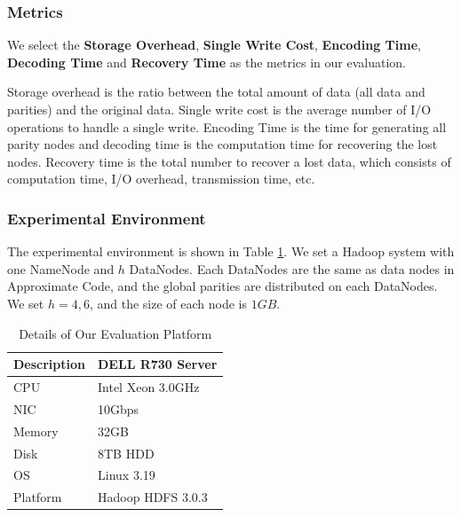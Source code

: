 \documentclass[sigconf]{acmart}
\begin{document}
\subsubsection{Metrics}
We select the \textbf{Storage Overhead}, \textbf{Single Write Cost}, \textbf{Encoding Time}, \textbf{Decoding Time} and \textbf{Recovery Time} as the metrics in our evaluation.

Storage overhead is the ratio between the total amount of data (all data and parities) and the original data. Single write cost is the average number of I/O operations to handle a single write. Encoding Time is the time for generating all parity nodes and decoding time is the computation time for recovering the lost nodes. Recovery time is the total number to recover a lost data, which consists of computation time, I/O overhead, transmission time, etc.

\subsubsection{Experimental Environment}
The experimental environment is shown in Table \ref{tab-platform}. We set a Hadoop system with one NameNode and $h$ DataNodes. Each DataNodes are the same as data nodes in Approximate Code, and the global parities are distributed on each DataNodes. We set $h=4,6$, and the size of each node is $1GB$. 



\begin{table}[!ht]\footnotesize
\begin{tabular}{|l|l|}
\hline
Description & DELL R730 Server \\ \hline
CPU & Intel Xeon 3.0GHz \\ \hline
NIC & 10Gbps \\ \hline
Memory & 32GB \\ \hline
Disk & 8TB HDD \\ \hline
OS & Linux 3.19 \\ \hline
Platform & Hadoop HDFS 3.0.3 \\ \hline
\end{tabular}
\caption{Details of Our Evaluation Platform}\label{tab-platform}
\vspace{-4mm}
\end{table}
\end{document}
